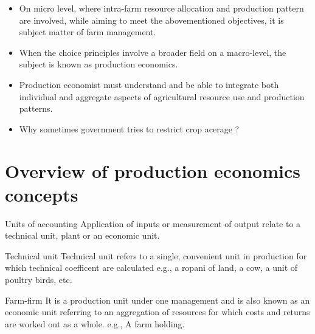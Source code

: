 \documentclass[12pt,ignorenonframetext,aspectratio=169]{beamer}
\providecommand{\tightlist}{%
  \setlength{\itemsep}{0pt}\setlength{\parskip}{0pt}}
\begin{document}
\begin{frame}{}
\protect\hypertarget{section-1}{}
\begin{itemize}
\tightlist
\item
  On micro level, where intra-farm resource allocation and production
  pattern are involved, while aiming to meet the abovementioned
  objectives, it is subject matter of farm management.
\item
  When the choice principles involve a broader field on a macro-level,
  the subject is known as production economics.
\item
  Production economist must understand and be able to integrate both
  individual and aggregate aspects of agricultural resource use and
  production patterns.
\item
  Why sometimes government tries to restrict crop acerage ?
\end{itemize}
\end{frame}

\hypertarget{overview-of-production-economics-concepts}{%
\section{Overview of production economics
concepts}\label{overview-of-production-economics-concepts}}

\begin{frame}{}
\protect\hypertarget{section-2}{}
\begin{block}{Units of accounting}
\protect\hypertarget{units-of-accounting}{}
Application of inputs or measurement of output relate to a technical
unit, plant or an economic unit.
\end{block}

\begin{block}{Technical unit}
\protect\hypertarget{technical-unit}{}
Technical unit refers to a single, convenient unit in production for
which technical coefficent are calculated e.g., a ropani of land, a cow,
a unit of poultry birds, etc.
\end{block}

\begin{block}{Farm-firm}
\protect\hypertarget{farm-firm}{}
It is a production unit under one management and is also known as an
economic unit referring to an aggregation of resources for which costs
and returns are worked out as a whole. e.g., A farm holding.
\end{block}
\end{frame}
\end{document}

